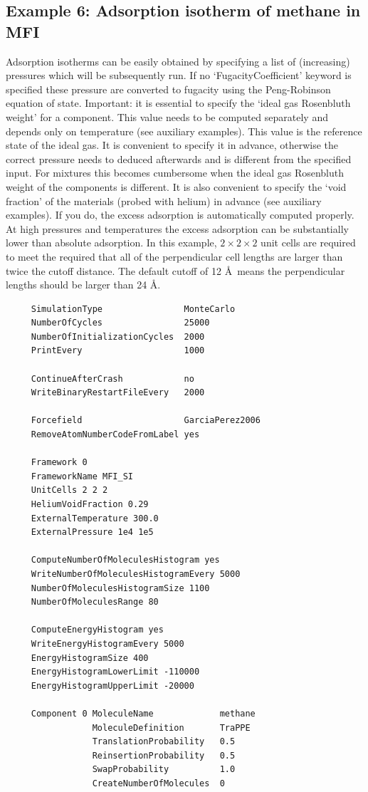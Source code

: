 \subsection*{Example 6: Adsorption isotherm of methane in MFI}
Adsorption isotherms can be easily obtained by specifying a list of (increasing) pressures which will be subsequently run.
If no `FugacityCoefficient' keyword is specified these pressure are converted to fugacity using the Peng-Robinson equation of state.
Important: it is essential to specify the `ideal gas Rosenbluth weight' for a component. This value needs to be computed separately
and depends only on temperature (see auxiliary examples). This value is the reference state of the ideal gas. It is convenient to specify
it in advance, otherwise the correct pressure needs to deduced afterwards and is different from the specified input. For mixtures this
becomes cumbersome when the ideal gas Rosenbluth weight of the components is different. It is also convenient to specify the `void fraction'
of the materials (probed with helium) in advance (see auxiliary examples). If you do, the excess adsorption is automatically computed properly.
At high pressures and temperatures the excess adsorption can be substantially lower than absolute adsorption.
In this example, $2\times2\times2$ unit cells are required to meet the required that all of the perpendicular cell lengths are larger than 
twice the cutoff distance. The default cutoff of 12 \AA\ means the perpendicular lengths should be larger than 24 \AA.

\begin{tiny}
\begin{verbatim}
     SimulationType                MonteCarlo
     NumberOfCycles                25000
     NumberOfInitializationCycles  2000
     PrintEvery                    1000
     
     ContinueAfterCrash            no
     WriteBinaryRestartFileEvery   2000
     
     Forcefield                    GarciaPerez2006
     RemoveAtomNumberCodeFromLabel yes
     
     Framework 0
     FrameworkName MFI_SI
     UnitCells 2 2 2
     HeliumVoidFraction 0.29
     ExternalTemperature 300.0
     ExternalPressure 1e4 1e5
     
     ComputeNumberOfMoleculesHistogram yes
     WriteNumberOfMoleculesHistogramEvery 5000
     NumberOfMoleculesHistogramSize 1100
     NumberOfMoleculesRange 80
     
     ComputeEnergyHistogram yes
     WriteEnergyHistogramEvery 5000
     EnergyHistogramSize 400
     EnergyHistogramLowerLimit -110000
     EnergyHistogramUpperLimit -20000
     
     Component 0 MoleculeName             methane
                 MoleculeDefinition       TraPPE
                 TranslationProbability   0.5
                 ReinsertionProbability   0.5
                 SwapProbability          1.0
                 CreateNumberOfMolecules  0
\end{verbatim}
\end{tiny}

